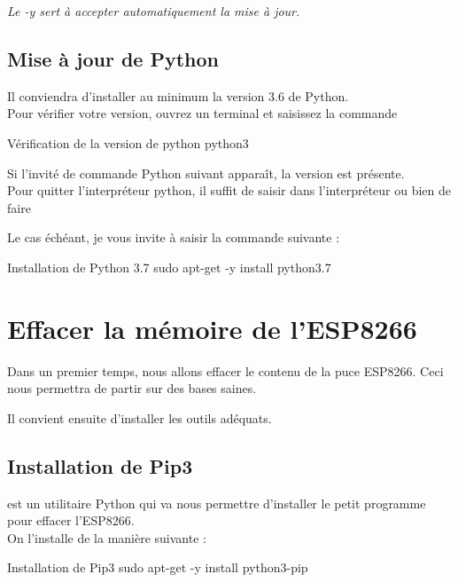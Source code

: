 {\textit{Le -y sert à accepter automatiquement la mise à jour.}

\subsection{Mise à jour de Python}

Il conviendra d'installer au minimum la version 3.6 de Python. \\
Pour vérifier votre version, ouvrez un terminal et saisissez la commande 

\begin{Bash}{Vérification de la version de python}
python3
\end{Bash}

Si l'invité de commande Python suivant apparaît, la version est présente. \\
Pour quitter l'interpréteur python, il suffit de saisir  dans l'interpréteur ou bien de faire 

Le cas échéant, je vous invite à saisir la commande suivante :

\begin{Bash}{Installation de Python 3.7}
sudo apt-get -y install python3.7
\end{Bash}\section{Effacer la mémoire de l'ESP8266}

Dans un premier temps, nous allons effacer le contenu de la puce ESP8266. Ceci nous permettra de partir sur des bases saines. \\


Il convient ensuite d'installer les outils adéquats.

\subsection{Installation de Pip3}

 est un utilitaire Python qui va nous permettre d'installer le petit programme pour effacer l'ESP8266. \\
On l'installe de la manière suivante : 

\begin{Bash}{Installation de Pip3}
sudo apt-get -y install python3-pip
\end{Bash}


}
